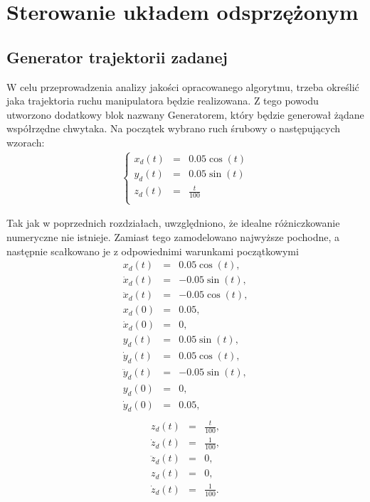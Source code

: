 \documentclass[eng,printmode]{mgr}
\begin{document}
\chapter{Sterowanie układem odsprzężonym}
\section{Generator trajektorii zadanej}
W celu przeprowadzenia analizy jakości opracowanego algorytmu, trzeba określić jaka trajektoria ruchu manipulatora będzie realizowana. Z tego powodu utworzono dodatkowy blok nazwany Generatorem, który będzie generował żądane współrzędne chwytaka. Na początek wybrano ruch śrubowy o następujących wzorach:
\begin{eqnarray}\label{row4.1}
\left\{ \begin{array}{lll}
x_d(t)&=& 0.05\cos\left(t\right)\\
y_d(t)&=&0.05\sin\left(t\right)\\
z_d(t)&=&\frac{t}{100} \\
\end{array} \right.
\end{eqnarray}


Tak jak w poprzednich rozdziałach, uwzględniono, że idealne różniczkowanie numeryczne nie istnieje. Zamiast tego zamodelowano najwyższe pochodne, a następnie scałkowano je z odpowiednimi warunkami początkowymi
\begin{eqnarray}
x_d(t)&=& 0.05\cos\left(t\right),\\ \nonumber
\dot{x}_d(t)&=& -0.05\sin\left(t\right),\\ \nonumber
\ddot{x}_d(t)&=& -0.05\cos\left(t\right),\\ \nonumber
x_d(0)&=&0.05,\\ \nonumber
\dot{x}_d(0)&=&0,\\ \nonumber
y_d(t)&=& 0.05\sin\left(t\right),\\ \nonumber
\dot{y}_d(t)&=&0.05\cos\left(t\right),\\ \nonumber
\ddot{y}_d(t)&=& -0.05\sin\left(t\right),\\ \nonumber
y_d(0)&=&0,\\ \nonumber
\dot{y}_d(0)&=&0.05,\\ \nonumber
\end{eqnarray}
\begin{eqnarray}
z_d(t)&=& \frac{t}{100},\\ \nonumber
\dot{z}_d(t)&=& \frac{1}{100},\\ \nonumber
\ddot{z}_d(t)&=& 0,\\ \nonumber
z_d(t)&=&0,\\ \nonumber
\dot{z}_d(t)&=&\frac{1}{100}.
\end{eqnarray}
\end{document}
